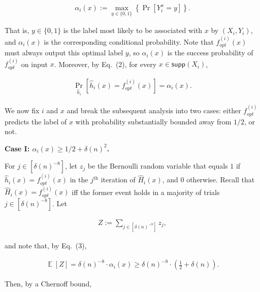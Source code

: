 \documentclass[10pt,a4paper]{article}
\begin{document}
\[\begin{gathered}
\alpha_{i}(x):=\max_{y\in\{0,1\}}\left\{\Pr[Y_{i}^{x}=y]\right\}.
\end{gathered}\]


That is, $y\in\{0,1\}$ is the label most likely to be associated with $x$ by $(X_{i},Y_{i})$, and $\alpha_{i}(x)$ is the corresponding conditional probability. Note that $f_{opt}^{(i)}(x)$ must always output this optimal label $y$, so $\alpha_{i}(x)$ is the success probability of $f_{opt}^{(i)}$ on input $x$. Moreover, by Eq. (2), for every $x\in{\mathsf{supp}}(X_{i})$,\par


\[\begin{gathered}
\displaystyle\Pr_{\hat{h}_{i}}\left[\hat{h}_{i}(x)=f_{opt}^{(i)}(x)\right]=\alpha_{i}(x).
\end{gathered}\]




We now fix $i$ and $x$ and break the subsequent analysis into two cases: either $f_{opt}^{(i)}$ predicts the label of $x$ with probability substantially bounded away from $1/2$, or not.\par





\par\medskip\noindent\textbf{Case I: $\alpha_{i}(x)\geq 1/2+\delta(n)^{2}$.}\par




For $j\in[\delta(n)^{-8}]$, let $z_{j}$ be the Bernoulli random variable that equals $1$ if $\hat{h}_{i}(x)=f_{opt}^{(i)}(x)$ in the $j^{\text{th}}$ iteration of $\hat{H}_{i}(x)$, and $0$ otherwise. Recall that $\hat{H}_{i}(x)=f_{opt}^{(i)}(x)$ iff the former event holds in a majority of trials $j\in[\delta(n)^{-8}]$. Let\par


\[\begin{gathered}
Z:=\sum_{j\in[\delta(n)^{-8}]}z_{j},
\end{gathered}\]


and note that, by Eq. (3),\par


\[\begin{gathered}
\mathop{\mathbb{E}}[Z]=\delta(n)^{-8}\cdot\alpha_{i}(x)\geq\delta(n)^{-8}\cdot\left(\frac{1}{2}+\delta(n)\right).
\end{gathered}\]


Then, by a Chernoff bound,\par
\end{document}
